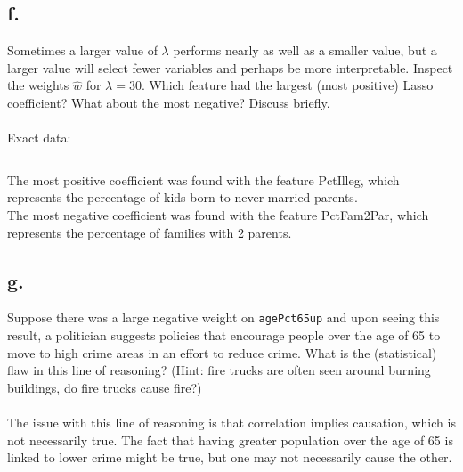\documentclass{article}
\newcommand{\1}{\mathbf{1}}
\begin{document}
{\subsection*{f.}

Sometimes a larger value of $\lambda$ performs nearly as well as a smaller value, but a larger value will select fewer variables and perhaps be more interpretable.  Inspect the weights $\hat{w}$ for $\lambda = 30$.  Which feature
    had the largest (most positive) Lasso coefficient? What about the most negative? Discuss briefly. \\ \\

Exact data:
\begin{verbatim}
\end{verbatim}

The most positive coefficient was found with the feature PctIlleg, which represents the percentage of kids born to never married parents. \\
The most negative coefficient was found with the feature PctFam2Par, which represents the percentage of families with 2 parents.

\subsection*{g.}

Suppose there was a large negative weight on
    \texttt{agePct65up} and upon seeing this result, a politician suggests policies that encourage people over the age of 65 to move to high crime areas in an effort to reduce crime. What is the (statistical) flaw in this line of reasoning? (Hint: fire trucks
    are often seen around burning buildings, do fire trucks cause fire?) \\ \\
The issue with this line of reasoning is that correlation implies causation, which is not necessarily true. The fact that having greater population over the age of 65 is linked to lower crime might be true, but one may not necessarily cause the other. 

}
\end{document}
